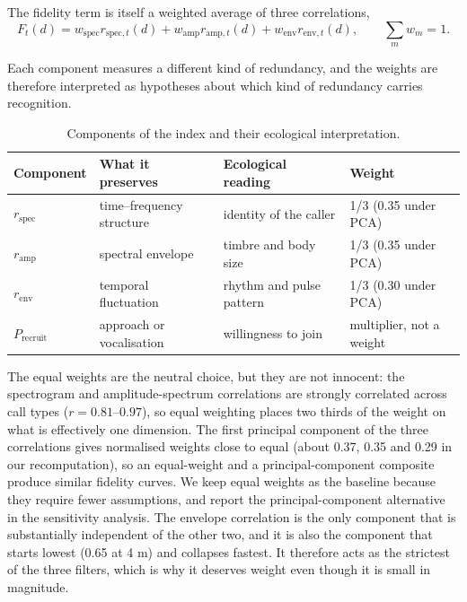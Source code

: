 The fidelity term is itself a weighted average of three correlations,
\begin{equation}\label{eq:fid}
  F_t(d) = w_{\mathrm{spec}} r_{\mathrm{spec},t}(d)
         + w_{\mathrm{amp}}  r_{\mathrm{amp},t}(d)
         + w_{\mathrm{env}}  r_{\mathrm{env},t}(d),
  \qquad \sum_m w_m = 1 .
\end{equation}

Each component measures a different kind of redundancy, and the weights are therefore
interpreted as hypotheses about which kind of redundancy carries recognition.

\begin{table}[htbp]
  \centering
  \caption{Components of the index and their ecological interpretation.}\label{tab:q4-weights}
  \small
  \begin{tabular}{llll}
    \toprule
    Component & What it preserves & Ecological reading & Weight \\
    \midrule
    $r_{\mathrm{spec}}$ & time--frequency structure & identity of the caller & 1/3 (0.35 under PCA) \\
    $r_{\mathrm{amp}}$ & spectral envelope & timbre and body size & 1/3 (0.35 under PCA) \\
    $r_{\mathrm{env}}$ & temporal fluctuation & rhythm and pulse pattern & 1/3 (0.30 under PCA) \\
    $P_{\mathrm{recruit}}$ & approach or vocalisation & willingness to join & multiplier, not a weight \\
    \bottomrule
  \end{tabular}
\end{table}

The equal weights are the neutral choice, but they are not innocent: the spectrogram and
amplitude-spectrum correlations are strongly correlated across call types ($r=0.81$--$0.97$), so equal
weighting places two thirds of the weight on what is effectively one dimension. The first
principal component of the three correlations gives normalised weights close to equal (about
0.37, 0.35 and 0.29 in our recomputation), so an equal-weight and a principal-component composite
produce similar fidelity curves. We keep equal weights as the baseline because they require fewer
assumptions, and report the principal-component alternative in the sensitivity analysis. The envelope correlation is the only component that is substantially
independent of the other two, and it is also the component that starts lowest (0.65 at 4 m) and
collapses fastest. It therefore acts as the strictest of the three filters, which is why it
deserves weight even though it is small in magnitude.

